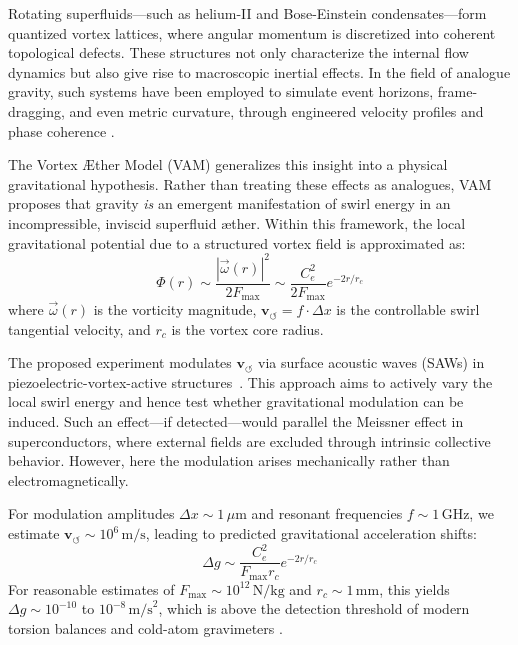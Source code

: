     Rotating superfluids—such as helium-II and Bose-Einstein condensates—form quantized vortex lattices, where angular momentum is discretized into coherent topological defects. These structures not only characterize the internal flow dynamics but also give rise to macroscopic inertial effects. In the field of analogue gravity, such systems have been employed to simulate event horizons, frame-dragging, and even metric curvature, through engineered velocity profiles and phase coherence \cite{barcelo2005analogue, volovik2003universe}.

    The Vortex \AE{}ther Model (VAM) generalizes this insight into a physical gravitational hypothesis. Rather than treating these effects as analogues, VAM proposes that gravity \emph{is} an emergent manifestation of swirl energy in an incompressible, inviscid superfluid \ae ther. Within this framework, the local gravitational potential due to a structured vortex field is approximated as:
    \[
        \Phi(r) \sim \frac{|\vec{\omega}(r)|^2}{2 F_{\text{max}}} \sim \frac{C_e^2}{2 F_{\text{max}}} e^{-2r/r_c}
    \]
    where \( \vec{\omega}(r) \) is the vorticity magnitude, \( \mathbf{v}_{\scriptscriptstyle\boldsymbol{\circlearrowleft}} = f \cdot \Delta x \) is the controllable swirl tangential velocity, and \( r_c \) is the vortex core radius.

    The proposed experiment modulates \( \mathbf{v}_{\scriptscriptstyle\boldsymbol{\circlearrowleft}} \) via surface acoustic waves (SAWs) in piezoelectric-vortex-active structures~\cite{iskandarani2025experimentalCe}. This approach aims to actively vary the local swirl energy and hence test whether gravitational modulation can be induced. Such an effect—if detected—would parallel the Meissner effect in superconductors, where external fields are excluded through intrinsic collective behavior. However, here the modulation arises mechanically rather than electromagnetically.

    For modulation amplitudes \( \Delta x \sim 1 \, \mu\text{m} \) and resonant frequencies \( f \sim 1\, \text{GHz} \), we estimate \( \mathbf{v}_{\scriptscriptstyle\boldsymbol{\circlearrowleft}} \sim 10^6 \, \text{m/s} \), leading to predicted gravitational acceleration shifts:
    \[
        \Delta g \sim \frac{C_e^2}{F_{\text{max}} r_c} e^{-2r/r_c}
    \]
    For reasonable estimates of \( F_{\text{max}} \sim 10^{12} \, \text{N/kg} \) and \( r_c \sim 1 \, \text{mm} \), this yields \( \Delta g \sim 10^{-10} \) to \( 10^{-8} \, \text{m/s}^2 \), which is above the detection threshold of modern torsion balances and cold-atom gravimeters \cite{packard1998superfluid, zmeev2018masssensor}.

